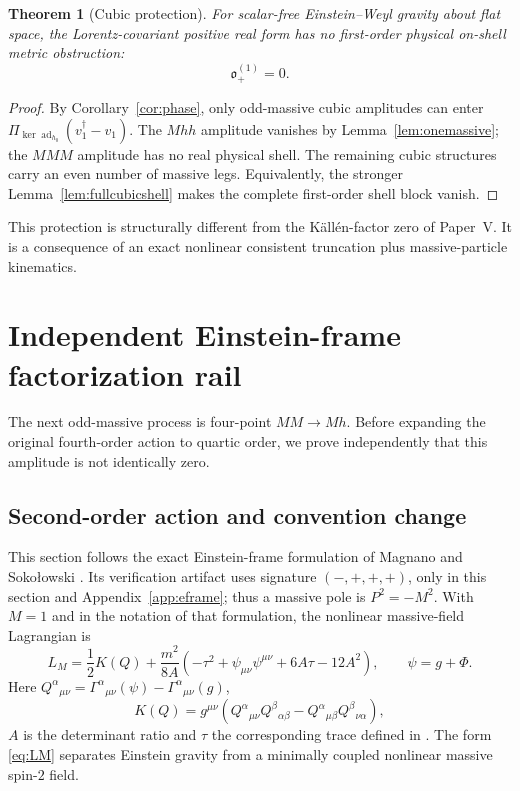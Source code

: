 \documentclass[11pt]{article}
\newtheorem{theorem}{Theorem}[section]
\theoremstyle{definition}
\theoremstyle{remark}
\newcommand{\dg}{\dagger}
\newcommand{\ad}{\operatorname{ad}}
\newcommand{\ob}{\mathfrak o}
\newcommand{\PiE}{\Pi_{\ker\ad_{h_0}}}
\begin{document}
\begin{theorem}[Cubic protection]\label{thm:cubicprotection}
For scalar-free Einstein--Weyl gravity about flat space, the
Lorentz-covariant positive real form has no first-order physical on-shell
metric obstruction:
\begin{equation}\label{eq:firstzero}
\boxed{\ob_+^{(1)}=0.}
\end{equation}
\end{theorem}

\begin{proof}
By Corollary~\ref{cor:phase}, only odd-massive cubic amplitudes can enter
$\PiE(v_1^{\dg}-v_1)$.  The $Mhh$ amplitude vanishes by
Lemma~\ref{lem:onemassive}; the $MMM$ amplitude has no real physical
shell.  The remaining cubic structures carry an even number of massive
legs.  Equivalently, the stronger Lemma~\ref{lem:fullcubicshell} makes
the complete first-order shell block vanish.
\end{proof}

This protection is structurally different from the K\"all\'en-factor
zero of Paper~V.  It is a consequence of an exact nonlinear consistent
truncation plus massive-particle kinematics.

\section{Independent Einstein-frame factorization rail}
\label{sec:factorization}

The next odd-massive process is four-point $MM\to Mh$.  Before expanding
the original fourth-order action to quartic order, we prove independently
that this amplitude is not identically zero.

\subsection{Second-order action and convention change}

This section follows the exact Einstein-frame formulation of Magnano and
Soko\l{}owski \cite{MagnanoSokolowski}.  Its verification artifact uses
signature $(-,+,+,+)$, only in this section and Appendix~\ref{app:eframe};
thus a massive pole is $P^2=-M^2$.  With $M=1$ and in the notation of that
formulation, the nonlinear massive-field Lagrangian is
\begin{equation}\label{eq:LM}
L_M=\frac12K(Q)+\frac{m^2}{8A}
\left(-\tau^2+\psi_{\mu\nu}\psi^{\mu\nu}
+6A\tau-12A^2\right),
\qquad \psi=g+\Phi .
\end{equation}
Here $Q^\alpha{}_{\mu\nu}=\Gamma^\alpha{}_{\mu\nu}(\psi)
-\Gamma^\alpha{}_{\mu\nu}(g)$,
\begin{equation}
K(Q)=g^{\mu\nu}\left(
Q^\alpha{}_{\mu\nu}Q^\beta{}_{\alpha\beta}
-Q^\alpha{}_{\mu\beta}Q^\beta{}_{\nu\alpha}\right),
\end{equation}
$A$ is the determinant ratio and $\tau$ the corresponding trace defined
in \cite{MagnanoSokolowski}.  The form \eqref{eq:LM} separates Einstein
gravity from a minimally coupled nonlinear massive spin-$2$ field.
\end{document}
